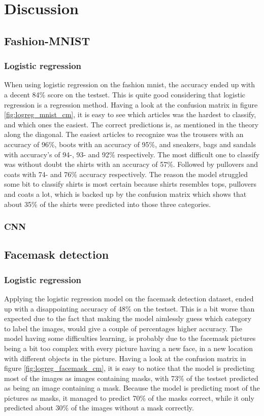 \documentclass[../main.tex]{subfiles}
\begin{document}
\section{Discussion}

\subsection{Fashion-MNIST}
\subsubsection{Logistic regression}
When using logistic regression on the fashion mnist, the accuracy ended up with a decent 84\% score on the testset. This is quite good considering that logistic regression is a regression method. Having a look at the confusion matrix in figure \ref{fig:logreg_mnist_cm}, it is easy to see which articles was the hardest to classify, and which ones the easiest. The correct predictions is, as mentioned in the theory along the diagonal. The easiest articles to recognize was the trousers with an accuracy of 96\%, boots with an accuracy of 95\%, and sneakers, bags and sandals with accuracy's of 94-, 93- and 92\% respectively. The most difficult one to classify was without doubt the shirts with an accuracy of 57\%. Followed by pullovers and coats with 74- and 76\% accuracy respectively. The reason the model struggled some bit to classify shirts is most certain because shirts resembles tops, pullovers and coats a lot, which is backed up by the confusion matrix which shows that about 35\% of the shirts were predicted into those three categories.

\subsubsection{CNN}


\subsection{Facemask detection}
\subsubsection{Logistic regression}
Applying the logistic regression model on the facemask detection dataset, ended up with a disappointing accuracy of 48\% on the testset. This is a bit worse than expected due to the fact that making the model aimlessly guess which category to label the images, would give a couple of percentages higher accuracy. The model having some difficulties learning, is probably due to the facemask pictures being a bit too complex with every picture having a new face, in a new location with different objects in the picture. Having a look at the confusion matrix in figure \ref{fig:logreg_facemask_cm}, it is easy to notice that the model is predicting most of the images as images containing masks, with 73\% of the testset predicted as being an image containing a mask. Because the model is predicting most of the pictures as masks, it managed to predict 70\% of the masks correct, while it only predicted about 30\% of the images without a mask correctly.
\end{document}
